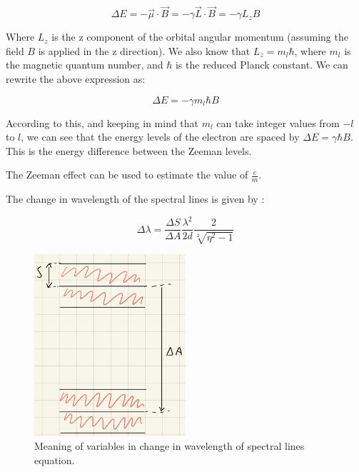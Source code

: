 \begin{equation}
    \Delta E = - \vec{\mu} \cdot \vec{B} = - \gamma \vec{L} \cdot \vec{B} = - \gamma L_z B
\end{equation}

Where $L_z$ is the z component of the orbital angular momentum (assuming the field $B$ is applied in the z direction). We also know that
$L_z = m_l \hbar$, where $m_l$ is the magnetic quantum number, and $\hbar$ is the reduced Planck constant. We can rewrite the above expression as:

\begin{equation}
    \Delta E = - \gamma m_l \hbar B
\end{equation}

According to this, and keeping in mind that $m_l$ can take integer values from $-l$ to $l$, we can see that the energy levels of the electron
are spaced by $\Delta E = \gamma \hbar B$. This is the energy difference between the Zeeman levels.






The Zeeman effect can be used to estimate the value of $\frac{e}{m}$.

The change in wavelength of the spectral lines is given by \cite{ZeemanEffectLab}:

\begin{equation}
    \Delta \lambda = \frac{\Delta S}{\Delta A} \frac{\lambda^2}{2d} \frac{2}{\sqrt[2]{\eta^2 - 1}}
\end{equation}


\begin{figure}
    \centering
    \includegraphics[width=0.5\textwidth]{intro/lambda_calc_diagram.jpeg}

    \caption{Meaning of variables in change in wavelength of spectral lines equation.}
    \label{fig:variables_lambda}
\end{figure}

